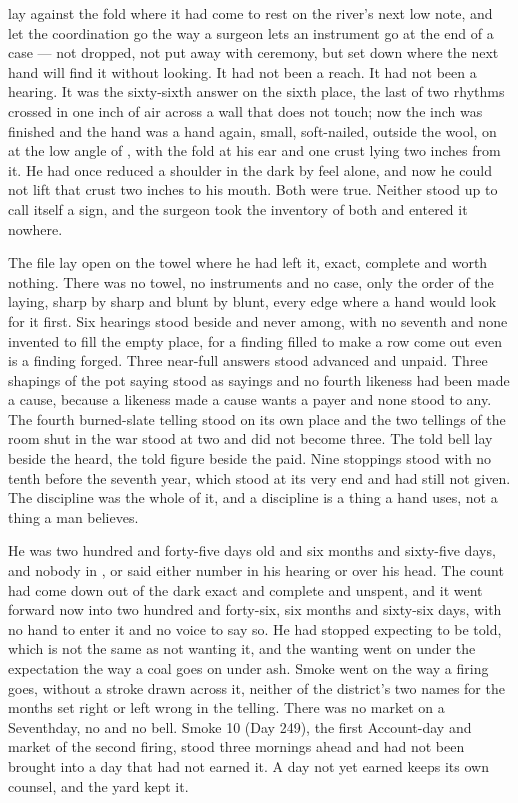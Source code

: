 
 lay against the fold where it had come to rest on the river's next low note, and  let the coordination go the way a surgeon lets an instrument go at the end of a case --- not dropped, not put away with ceremony, but set down where the next hand will find it without looking. It had not been a reach. It had not been a hearing. It was the sixty-sixth answer on the sixth place, the last of two rhythms crossed in one inch of air across a wall that does not touch; now the inch was finished and the hand was a hand again, small, soft-nailed, outside the wool, on  at the low angle of , with the fold at his ear and one crust lying two inches from it. He had once reduced a shoulder in the dark by feel alone, and now he could not lift that crust two inches to his mouth. Both were true. Neither stood up to call itself a sign, and the surgeon took the inventory of both and entered it nowhere.

The file lay open on the towel where he had left it, exact, complete and worth nothing. There was no towel, no instruments and no case, only the order of the laying, sharp by sharp and blunt by blunt, every edge where a hand would look for it first. Six hearings stood beside  and never among, with no seventh and none invented to fill the empty place, for a finding filled to make a row come out even is a finding forged. Three near-full answers stood advanced and unpaid. Three shapings of the pot saying stood as sayings and no fourth likeness had been made a cause, because a likeness made a cause wants a payer and none stood to any. The fourth burned-slate telling stood on its own place and the two tellings of the room shut in the war stood at two and did not become three. The told bell lay beside the heard, the told figure beside the paid. Nine stoppings stood with no tenth before the seventh year, which stood at its very end and had still not given. The discipline was the whole of it, and a discipline is a thing a hand uses, not a thing a man believes.

He was two hundred and forty-five days old and six months and sixty-five days, and nobody in ,  or  said either number in his hearing or over his head. The count had come down out of the dark exact and complete and unspent, and it went forward now into two hundred and forty-six, six months and sixty-six days, with no hand to enter it and no voice to say so. He had stopped expecting to be told, which is not the same as not wanting it, and the wanting went on under the expectation the way a coal goes on under ash. Smoke went on the way a firing goes, without a stroke drawn across it, neither of the district's two names for the months set right or left wrong in the telling. There was no market on a Seventhday, no  and no bell. Smoke 10 (Day 249), the first Account-day and market of the second firing, stood three mornings ahead and had not been brought into a day that had not earned it. A day not yet earned keeps its own counsel, and the yard kept it.

